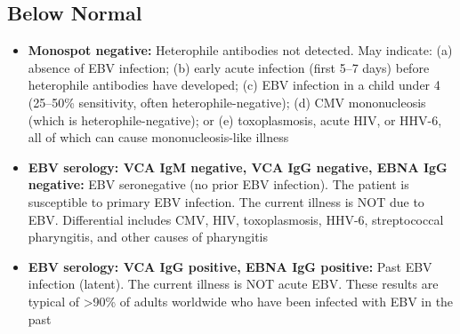\subsection*{Below Normal}
\begin{itemize}
  \item \textbf{Monospot negative:} Heterophile antibodies not detected. May indicate: (a) absence of EBV infection; (b) early acute infection (first 5--7 days) before heterophile antibodies have developed; (c) EBV infection in a child under 4 (25--50\% sensitivity, often heterophile-negative); (d) CMV mononucleosis (which is heterophile-negative); or (e) toxoplasmosis, acute HIV, or HHV-6, all of which can cause mononucleosis-like illness
  \item \textbf{EBV serology: VCA IgM negative, VCA IgG negative, EBNA IgG negative:} EBV seronegative (no prior EBV infection). The patient is susceptible to primary EBV infection. The current illness is NOT due to EBV. Differential includes CMV, HIV, toxoplasmosis, HHV-6, streptococcal pharyngitis, and other causes of pharyngitis
  \item \textbf{EBV serology: VCA IgG positive, EBNA IgG positive:} Past EBV infection (latent). The current illness is NOT acute EBV. These results are typical of >90\% of adults worldwide who have been infected with EBV in the past
\end{itemize}

